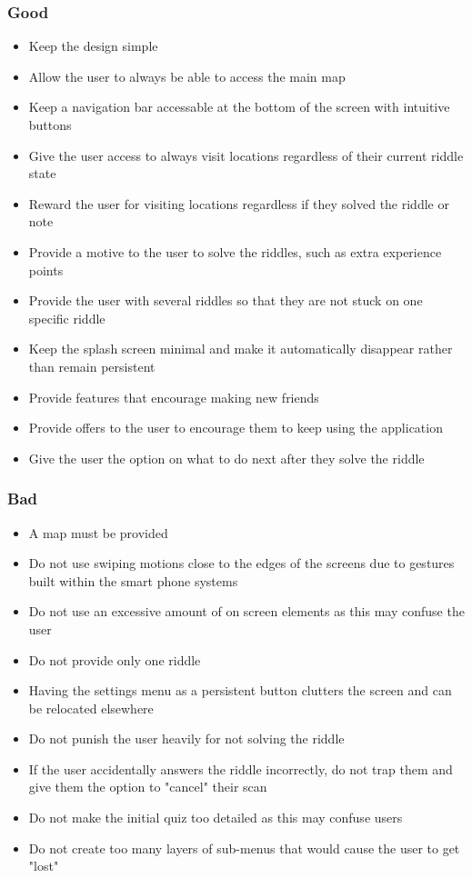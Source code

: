 \documentclass[10pt,twocolumn]{article} %
\begin{document}
\subsubsection*{Good}
\begin{itemize}[noitemsep]
  \item Keep the design simple
  \item Allow the user to always be able to access the main map
  \item Keep a navigation bar accessable at the bottom of the screen with intuitive buttons
  \item Give the user access to always visit locations regardless of their current riddle state
  \item Reward the user for visiting locations regardless if they solved the riddle or note
  \item Provide a motive to the user to solve the riddles, such as extra experience points
  \item Provide the user with several riddles so that they are not stuck on one specific riddle
  \item Keep the splash screen minimal and make it automatically disappear rather than remain persistent
  \item Provide features that encourage making new friends
  \item Provide offers to the user to encourage them to keep using the application
  \item Give the user the option on what to do next after they solve the riddle
\end{itemize}

\subsubsection*{Bad}
\begin{itemize}[noitemsep]
  \item A map must be provided
  \item Do not use swiping motions close to the edges of the screens due to gestures built within the smart phone systems
  \item Do not use an excessive amount of on screen elements as this may confuse the user
  \item Do not provide only one riddle
  \item Having the settings menu as a persistent button clutters the screen and can be relocated elsewhere
  \item Do not punish the user heavily for not solving the riddle
  \item If the user accidentally answers the riddle incorrectly, do not trap them and give them the option to "cancel" their scan
  \item Do not make the initial quiz too detailed as this may confuse users
  \item Do not create too many layers of sub-menus that would cause the user to get "lost"
\end{itemize}
\end{document}
